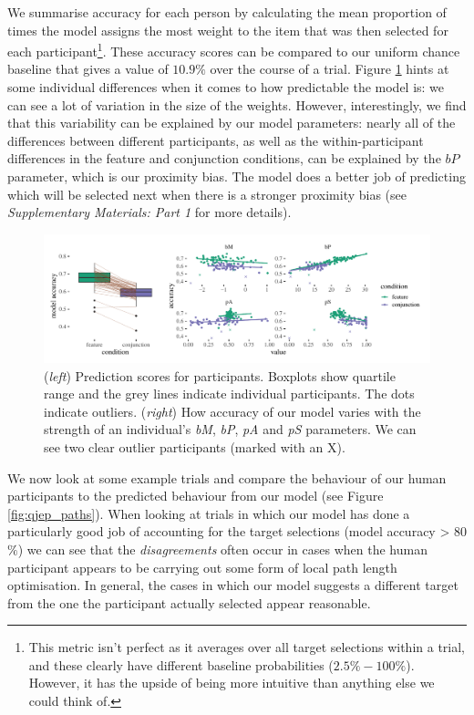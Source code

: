\documentclass[preprints, article,submit,pdftex,moreauthors]{Definitions/mdpi}
\begin{document}
We summarise accuracy for each person by calculating the mean proportion of times the model assigns the most weight to the item that was then selected for each participant\footnote{This metric isn't perfect as it averages over all target selections within a trial, and these clearly have different baseline probabilities ($2.5\%-100\%$). However, it has the upside of being more intuitive than anything else we could think of.}. These accuracy scores can be compared to our uniform chance baseline that gives a value of $10.9\%$ over the course of a trial. Figure \ref{fig:cal2} hints at some individual differences when it comes to how predictable the model is: we can see a lot of variation in the size of the weights. However, interestingly, we find that this variability can be explained by our model parameters: nearly all of the differences between different participants, as well as the within-participant differences in the feature and conjunction conditions, can be explained by the $bP$ parameter, which is our proximity bias. The model does a better job of predicting which will be selected next when there is a stronger proximity bias (see \textit{Supplementary Materials: Part 1} for more details).

\begin{figure}[H]
\centering
\includegraphics[width=12 cm]{Figures/qjep_indiv_diff.pdf}
\caption{(\textit{left}) Prediction scores for participants. Boxplots show quartile range and the grey lines indicate individual participants. The dots indicate outliers. (\textit{right}) How accuracy of our model varies with the strength of an individual’s \textit{bM}, \textit{bP}, \textit{pA} and \textit{pS} parameters. We can see two clear outlier participants (marked with an X).}
\label{fig:cal2}
\end{figure}   

We now look at some example trials and compare the behaviour of our human participants to the predicted behaviour from our model (see Figure \ref{fig:qjep_paths}). When looking at trials in which our model has done a particularly good job of accounting for the target selections (model accuracy > 80$\%$) we can see that the \textit{disagreements} often occur in cases when the human participant appears to be carrying out some form of local path length optimisation. In general, the cases in which our model suggests a different target from the one the participant actually selected appear reasonable. 
\end{document}
